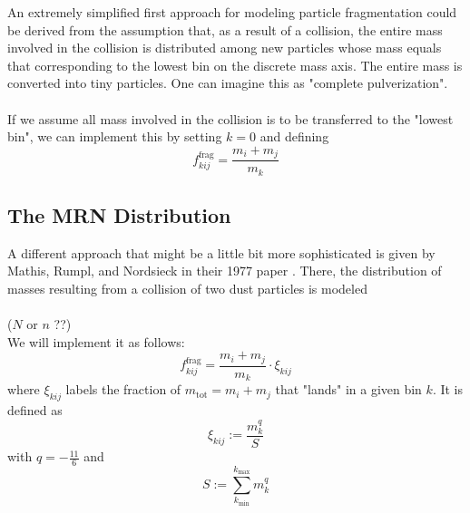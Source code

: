        An extremely simplified first approach for modeling particle fragmentation 
        could be derived from the assumption that, as a result of a collision,
        the entire mass involved in the collision is distributed among new 
        particles whose mass equals that corresponding to the lowest bin on the 
        discrete mass axis. The entire mass is converted into tiny particles. 
        One can imagine this as "complete pulverization". \\
         \\


        If we assume all mass involved in the collision is to be transferred to the 
        "lowest bin", we can implement this by setting $k=0$ and defining
        \begin{equation}
            f^\text{frag}_{kij} = \frac{m_i + m_j}{m_k}
        \end{equation}

    \clearpage
    \subsection{The MRN Distribution}
        
        A different approach that might be a little bit more sophisticated is given by 
        Mathis, Rumpl, and Nordsieck in their 1977 paper \cite{mathis_rumpl_nordsieck_1977}.
        There, the distribution of masses resulting from a collision of two dust particles 
        is modeled \\
         \\
         ($N$ or $n$ ??) \\

        We will implement it as follows:
        \begin{equation}
            f^\text{frag}_{kij} = \frac{m_i + m_j}{m_k} \cdot \xi_{kij}
        \end{equation}
        where $\xi_{kij}$ labels the fraction of $m_\text{tot} = m_i + m_j$ that "lands" in 
        a given bin $k$. It is defined as 
        \begin{equation}
            \xi_{kij} := \frac{m_k^q}{S}
        \end{equation}
        with $q=-\frac{11}{6}$ and
        \begin{equation}
            S := \sum_{k_\text{min}}^{k_\text{max}} m_k^q %
        \end{equation}

